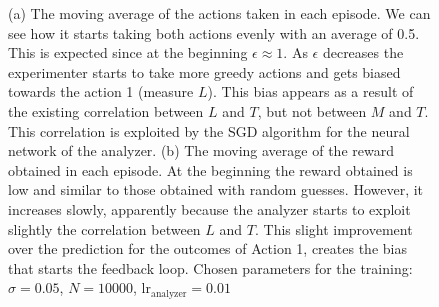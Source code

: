 \documentclass[11pt,a4paper,twoside]{report}
\newcommand{\+}{\textnormal{+} }
\theoremstyle{definition}
\numberwithin{equation}{chapter}
\begin{document}
\begin{figure}[h]
  \caption{(a) The moving average of the actions taken in each episode. We can
  see how it starts taking both actions evenly with an average of 0.5. This is
  expected since at the beginning $\epsilon \approx 1$. As $\epsilon$ decreases
  the experimenter starts to take more greedy actions and gets biased towards
  the action 1 (measure $L$). This bias appears as a result of the existing
  correlation between $L$ and $T$, but not between $M$ and $T$. This correlation
  is exploited by the SGD algorithm for the neural network of the analyzer. (b)
  The moving average of the reward obtained in each episode. At the beginning
  the reward obtained is low and similar to those obtained with random guesses.
  However, it increases slowly, apparently because the analyzer starts to
  exploit slightly the correlation between $L$ and $T$. This slight improvement
  over the prediction for the outcomes of Action 1, creates the bias that starts
  the feedback loop. Chosen parameters for the training: $\sigma=0.05$,
  $N=10000$, $\text{lr}_\text{analyzer}=0.01$}
  \label{fig:PendulumTraining}
  \end{figure}
\end{document}
